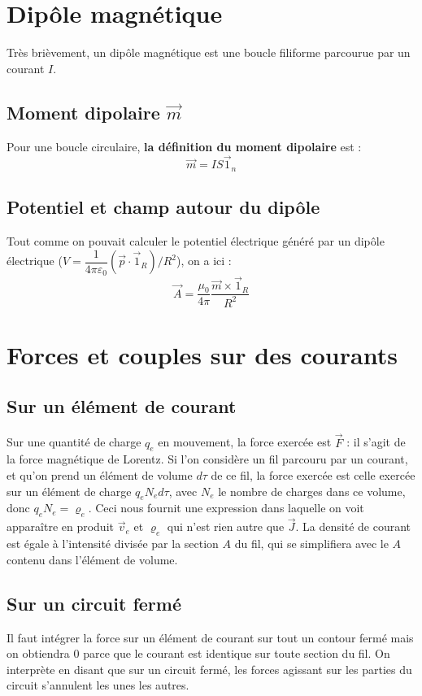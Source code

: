 \documentclass[12pt]{book}
\begin{document}
\section{Dipôle magnétique}
Très brièvement, un dipôle magnétique est une boucle filiforme parcourue par un courant $I$.
\subsection{Moment dipolaire $\vec{m}$}
Pour une boucle circulaire, \textbf{la définition du moment dipolaire }est : $$\vec{m} = IS\vec{1}_n$$

\subsection{Potentiel et champ autour du dipôle}
Tout comme on pouvait calculer le potentiel électrique généré par un dipôle électrique ($V = \dfrac{1}{4\pi\varepsilon_0} (\vec{p}\cdot \vec{1}_R)/R^2$), on a ici : $$\vec{A} = \dfrac{\mu_0}{4\pi} \dfrac{\vec{m} \times \vec{1}_R}{R^2} $$

\section{Forces et couples sur des courants}
\subsection{Sur un élément de courant}
Sur une quantité de charge $q_e$ en mouvement, la force exercée est $\vec{F}$ : il s'agit de la force magnétique de Lorentz. Si l'on considère un fil parcouru par un courant, et qu'on prend un élément de volume $d\tau$ de ce fil, la force exercée est celle exercée sur un élément de charge $q_e N_e d\tau$, avec $N_e$ le nombre de charges dans ce volume, donc $q_e N_e = \varrho_e$. Ceci nous fournit une expression dans laquelle on voit apparaître en produit $\vec{v}_e$ et $\varrho_e$ qui n'est rien autre que $\vec{J}$. La densité de courant est égale à l'intensité divisée par la section $A$ du fil, qui se simplifiera avec le $A$ contenu dans l'élément de volume.
\subsection{Sur un circuit fermé}
Il faut intégrer la force sur un élément de courant sur tout un contour fermé mais on obtiendra 0 parce que le courant est identique sur toute section du fil. On interprète en disant que sur un circuit fermé, les forces agissant sur les parties du circuit s'annulent les unes les autres.
\end{document}
